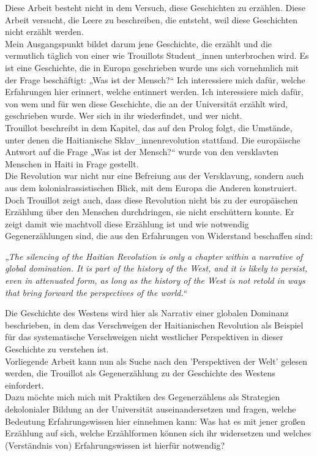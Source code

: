 \noindent Diese Arbeit besteht nicht in dem Versuch, diese Geschichten zu erzählen. Diese
Arbeit versucht, die Leere zu beschreiben, die entsteht, weil diese Geschichten
nicht erzählt werden.\\

\noindent Mein Ausgangspunkt bildet darum jene Geschichte, die erzählt und
die vermutlich täglich von einer wie Trouillots Student\_innen unterbrochen
wird. Es ist eine Geschichte, die in Europa geschrieben wurde uns sich
vornehmlich mit der Frage beschäftigt: „Was ist der Mensch?“ Ich interessiere
mich dafür, welche Erfahrungen hier erinnert, welche entinnert werden. Ich
interessiere mich dafür, von wem und für wen diese Geschichte, die an der
Universität erzählt wird, geschrieben wurde. Wer sich in ihr wiederfindet, und
wer nicht.\\

Trouillot beschreibt in dem Kapitel, das auf den Prolog folgt, die Umstände,
unter denen die Haitianische Sklav\_innenrevolution stattfand. Die europäische
Antwort auf die Frage „Was ist der Mensch?“ wurde von den versklavten Menschen
in Haiti in Frage gestellt. \\
Die Revolution war nicht nur eine Befreiung aus der
Versklavung, sondern auch aus dem kolonialrassistischen Blick, mit dem Europa
die Anderen konstruiert. Doch Trouillot zeigt auch, dass diese Revolution nicht
bis zu der europäischen Erzählung über den Menschen durchdringen, sie nicht
erschüttern konnte. Er zeigt damit wie machtvoll diese Erzählung ist und wie
notwendig Gegenerzählungen sind, die aus den Erfahrungen von Widerstand
beschaffen sind:

\begin{myenv}
  \textit{„The silencing of the Haitian Revolution is only a chapter within a
  narrative of global domination. It is part of the history of the West, and it
is likely to persist, even in attenuated form, as long as the history of the
West is not retold in ways that bring forward the perspectives of the
world.“\footnotemark{}}
\end{myenv}
Die Geschichte des Westens wird hier als Narrativ einer globalen Dominanz
beschrieben, in dem das Verschweigen der Haitianischen Revolution als Beispiel
für das systematische Verschweigen nicht westlicher Perspektiven in dieser
Geschichte zu verstehen ist.\\ 

Vorliegende Arbeit kann nun als Suche nach den 'Perspektiven der Welt' gelesen
werden, die Trouillot als Gegenerzählung zu der Geschichte des Westens
einfordert.\\
Dazu möchte mich mich mit Praktiken des Gegenerzählens als Strategien
dekolonialer Bildung an der Universität auseinandersetzen und fragen, welche
Bedeutung Erfahrungswissen hier einnehmen kann: Was hat es mit jener großen
Erzählung auf sich, welche Erzählformen können sich ihr widersetzen und welches
(Verständnis von) Erfahrungswissen ist hierfür notwendig?


